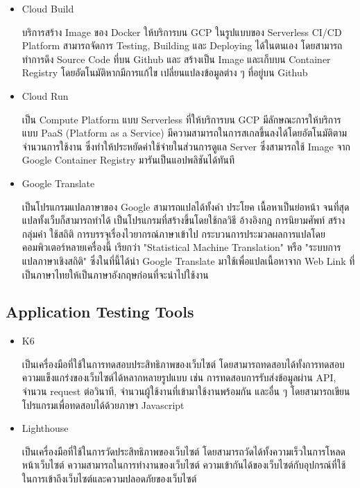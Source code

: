 \documentclass[12pt,oneside,openright,a4paper]{cpe-thai-project}
\begin{document}
\begin{itemize}
      \item Cloud Build
      
      \hspace{1cm}บริการสร้าง Image ของ Docker ให้บริการบน GCP ในรูปแบบของ Serverless CI/CD Platform 
      สามารถจัดการ Testing, Building และ Deploying ได้ในตนเอง โดยสามารถทำการดึง Source Code ที่บน Github และ สร้างเป็น Image 
      และเก็บบน Container Registry โดยอัตโนมัติหากมีการแก้ไข เปลี่ยนแปลงข้อมูลต่าง ๆ ที่อยู่บน Github \cite{cloud_build}

      \item Cloud Run
      
      \hspace{1cm}เป็น Compute Platform แบบ Serverless ที่ให้บริการบน GCP มีลักษณะการให้บริการแบบ PaaS (Platform as a Service) 
      มีความสามารถในการสเกลขึ้นลงได้โดยอัตโนมัติตามจำนวนการใช้งาน 
      ซึ่งทำให้ประหยัดค่าใช้จ่ายในส่วนการดูแล Server ซึ่งสามารถใช้ Image จาก Google Container Registry มารันเป็นแอปพลิชันได้ทันที \cite{cloud_run}

      \item Google Translate
      
      \hspace{1cm}เป็นโปรแกรมแปลภาษาของ Google สามารถแปลได้ทั้งคำ ประโยค เนื้อหาเป็นย่อหน้า จนที่สุดแปลทั้งเว็บก็สามารถทำได้
      เป็นโปรแกรมที่สร้างขึ้นโดยใช้กลวิธี อ้างอิงกฎ การนิยามศัพท์ สร้างกลุ่มคำ ใช้สถิติ การบรรจุเรื่องไวยากรณ์ภาษาเข้าไป 
      กระบวนการประมวลผลการแปลโดยคอมพิวเตอร์หลายเครื่องนี้ เรียกว่า "Statistical Machine Translation" หรือ "ระบบการแปลภาษาเชิงสถิติ" \cite{gg_tran}
      ซึ่งในที่นี้ได้นำ Google Translate มาใช้เพื่อแปลเนื้อหาจาก Web Link ที่เป็นภาษาไทยให้เป็นภาษาอังกฤษก่อนที่จะนำไปใช้งาน
    \end{itemize}

  \subsection{Application Testing Tools}
    \begin{itemize}
      \item K6
      
        \hspace{1cm}เป็นเครื่องมือที่ใช้ในการทดสอบประสิทธิภาพของเว็บไซต์ โดยสามารถทดสอบได้ทั้งการทดสอบความแข็งแกร่งของเว็บไซต์ได้หลากหลายรูปแบบ เช่น 
        การทดสอบการรับส่งข้อมูลผ่าน API, จำนวน request ต่อวินาที, จำนวนผู้ใช้งานที่เข้ามาใช้งานพร้อมกัน และอื่น ๆ โดยสามารถเขียนโปรแกรมเพื่อทดสอบได้ด้วยภาษา Javascript \cite{k6}

      \item Lighthouse

        \hspace{1cm}เป็นเครื่องมือที่ใช้ในการวัดประสิทธิภาพของเว็บไซต์ โดยสามารถวัดได้ทั้งความเร็วในการโหลดหน้าเว็บไซต์ ความสามารถในการทำงานของเว็บไซต์ 
        ความเข้ากันได้ของเว็บไซต์กับอุปกรณ์ที่ใช้ในการเข้าถึงเว็บไซต์และความปลอดภัยของเว็บไซต์ \cite{lighthouse}
    \end{itemize}
\end{document}
